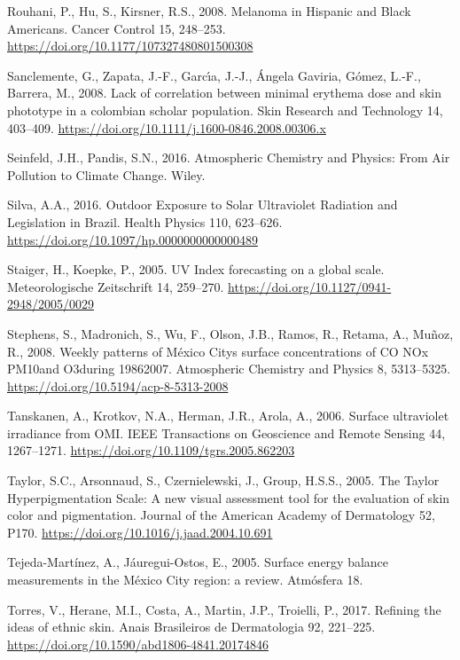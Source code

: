 \documentclass[10pt]{article}
\begin{document}
\label{csl:37}Rouhani, P., Hu, S., Kirsner, R.S., 2008. {Melanoma in Hispanic and Black Americans}. Cancer Control 15, 248–253. \url{https://doi.org/10.1177/107327480801500308}

\label{csl:70}Sanclemente, G., Zapata, J.-F., Garc{\'{\i}}a, J.-J., {\'{A}}ngela Gaviria, G{\'{o}}mez, L.-F., Barrera, M., 2008. {Lack of correlation between minimal erythema dose and skin phototype in a colombian scholar population}. Skin Research and Technology 14, 403–409. \url{https://doi.org/10.1111/j.1600-0846.2008.00306.x}

\label{csl:10}Seinfeld, J.H., Pandis, S.N., 2016. {Atmospheric Chemistry and Physics: From Air Pollution to Climate Change}. Wiley.

\label{csl:52}Silva, A.A., 2016. {Outdoor Exposure to Solar Ultraviolet Radiation and Legislation in Brazil}. Health Physics 110, 623–626. \url{https://doi.org/10.1097/hp.0000000000000489}

\label{csl:56}Staiger, H., Koepke, P., 2005. {{UV} Index forecasting on a global scale}. Meteorologische Zeitschrift 14, 259–270. \url{https://doi.org/10.1127/0941-2948/2005/0029}

\label{csl:66}Stephens, S., Madronich, S., Wu, F., Olson, J.B., Ramos, R., Retama, A., Mu{\~{n}}oz, R., 2008. {Weekly patterns of M{\'{e}}xico City{\textquotesingle}s surface concentrations of {CO} {NOx} {PM}10and O3during 1986{\textendash}2007}. Atmospheric Chemistry and Physics 8, 5313–5325. \url{https://doi.org/10.5194/acp-8-5313-2008}

\label{csl:27}Tanskanen, A., Krotkov, N.A., Herman, J.R., Arola, A., 2006. {Surface ultraviolet irradiance from {OMI}}. {IEEE} Transactions on Geoscience and Remote Sensing 44, 1267–1271. \url{https://doi.org/10.1109/tgrs.2005.862203}

\label{csl:41}Taylor, S.C., Arsonnaud, S., Czernielewski, J., Group, H.S.S., 2005. {The Taylor Hyperpigmentation Scale: A new visual assessment tool for the evaluation of skin color and pigmentation}. Journal of the American Academy of Dermatology 52, P170. \url{https://doi.org/10.1016/j.jaad.2004.10.691}

\label{csl:7}Tejeda-Martínez, A., Jáuregui-Ostos, E., 2005. {Surface energy balance measurements in the México City region: a review}. Atmósfera 18.

\label{csl:48}Torres, V., Herane, M.I., Costa, A., Martin, J.P., Troielli, P., 2017. {Refining the ideas of ethnic skin}. Anais Brasileiros de Dermatologia 92, 221–225. \url{https://doi.org/10.1590/abd1806-4841.20174846}
\end{document}
